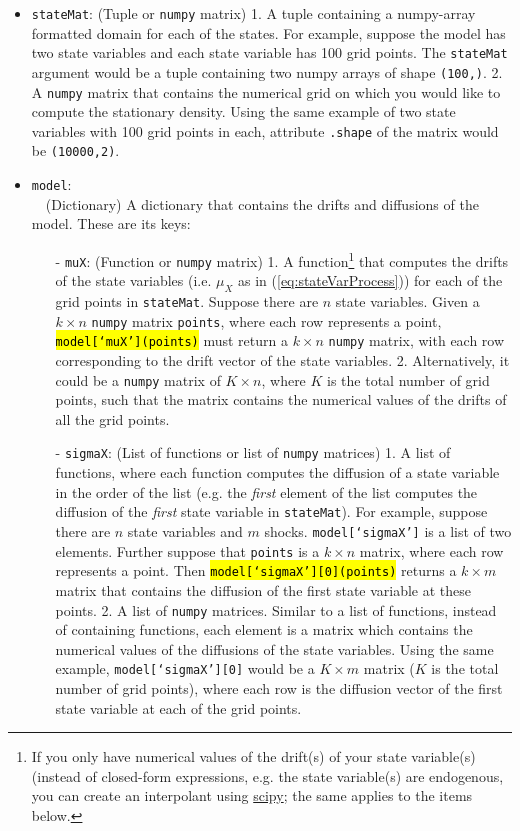 \documentclass[12pt]{article}
\DeclareRobustCommand{\hlCODE}[1]{{\sethlcolor{backcolour}\hl{#1}}}
\begin{document}
\begin{itemize}
\item \texttt{stateMat}: (Tuple or \texttt{numpy} matrix) 1. A tuple containing a numpy-array formatted domain for each of the states. For example, suppose the model has two state variables and each state variable has 100 grid points. The \texttt{stateMat} argument would be a tuple containing two numpy arrays of shape \texttt{(100,)}. 2. A \texttt{numpy} matrix that contains the numerical grid on which you would like to compute the stationary density. Using the same example of two state variables with 100 grid points in each, attribute \texttt{.shape} of the matrix would be \texttt{(10000,2)}.

\item \texttt{model}: \\~\ (Dictionary) A dictionary that contains the drifts and diffusions of the model. These are its keys:
	\begin{itemize}
	\item[-] \texttt{muX}: (Function or \texttt{numpy} matrix) 1. A function\footnote{If you only have numerical values of the drift(s) of your state variable(s) (instead of closed-form expressions, e.g. the state variable(s) are endogenous, you can create an interpolant using \href{https://docs.scipy.org/doc/scipy/reference/tutorial/interpolate.html}{scipy}; the same applies to the items below.} that computes the drifts of the state variables (i.e. $\mu_X$ as in (\ref{eq:stateVarProcess})) for each of the grid points in \texttt{stateMat}. Suppose there are $n$ state variables. Given a $k \times n$ \texttt{numpy} matrix \texttt{points}, where each row represents a point, \hlCODE{\texttt{model[`muX'](points)}} must return a $k \times n$ \texttt{numpy} matrix, with each row corresponding to the drift vector of the state variables. 2. Alternatively, it could be a \texttt{numpy} matrix of $K \times n$, where $K$ is the total number of grid points, such that the matrix contains the numerical values of the drifts of all the grid points.
	\item[-] \texttt{sigmaX}: (List of functions or list of \texttt{numpy} matrices) 1. A list of functions, where each function computes the diffusion of a state variable in the order of the list (e.g. the  \textit{first} element of the list computes the diffusion of the \textit{first} state variable in \texttt{stateMat}). For example, suppose there are $n$ state variables and $m$ shocks. \texttt{model[`sigmaX']} is a list of two elements. Further suppose that \texttt{points} is a $k \times n$ matrix, where each row represents a point. Then \hlCODE{\texttt{model[`sigmaX'][0](points)}} returns a $k \times m$ matrix that contains the diffusion of the first state variable at these points. 2. A list of \texttt{numpy} matrices. Similar to a list of functions, instead of containing functions, each element is a matrix which contains the numerical values of the diffusions of the state variables. Using the same example, \texttt{model[`sigmaX'][0]} would be a $K \times m$ matrix ($K$ is the total number of grid points), where each row is the diffusion vector of the first state variable at each of the grid points.


\end{itemize}
\end{itemize}
\end{document}

